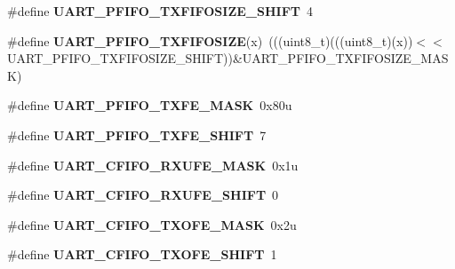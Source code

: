 \begin{DoxyCompactItemize}
\item 
\#define {\bfseries U\+A\+R\+T\+\_\+\+P\+F\+I\+F\+O\+\_\+\+T\+X\+F\+I\+F\+O\+S\+I\+Z\+E\+\_\+\+S\+H\+I\+FT}~4\hypertarget{group__UART__Register__Masks_gaa0377f9b585a07f11f887a7d2c8133c8}{}\label{group__UART__Register__Masks_gaa0377f9b585a07f11f887a7d2c8133c8}

\item 
\#define {\bfseries U\+A\+R\+T\+\_\+\+P\+F\+I\+F\+O\+\_\+\+T\+X\+F\+I\+F\+O\+S\+I\+ZE}(x)~(((uint8\+\_\+t)(((uint8\+\_\+t)(x))$<$$<$U\+A\+R\+T\+\_\+\+P\+F\+I\+F\+O\+\_\+\+T\+X\+F\+I\+F\+O\+S\+I\+Z\+E\+\_\+\+S\+H\+I\+FT))\&U\+A\+R\+T\+\_\+\+P\+F\+I\+F\+O\+\_\+\+T\+X\+F\+I\+F\+O\+S\+I\+Z\+E\+\_\+\+M\+A\+SK)\hypertarget{group__UART__Register__Masks_ga4c13afc31f45e633d2dc02707b332d11}{}\label{group__UART__Register__Masks_ga4c13afc31f45e633d2dc02707b332d11}

\item 
\#define {\bfseries U\+A\+R\+T\+\_\+\+P\+F\+I\+F\+O\+\_\+\+T\+X\+F\+E\+\_\+\+M\+A\+SK}~0x80u\hypertarget{group__UART__Register__Masks_gabd2ffab4f7a98fcfc64dcd37db1b289b}{}\label{group__UART__Register__Masks_gabd2ffab4f7a98fcfc64dcd37db1b289b}

\item 
\#define {\bfseries U\+A\+R\+T\+\_\+\+P\+F\+I\+F\+O\+\_\+\+T\+X\+F\+E\+\_\+\+S\+H\+I\+FT}~7\hypertarget{group__UART__Register__Masks_gaf418bafa3c46ece2f82d0c831e8aea47}{}\label{group__UART__Register__Masks_gaf418bafa3c46ece2f82d0c831e8aea47}

\item 
\#define {\bfseries U\+A\+R\+T\+\_\+\+C\+F\+I\+F\+O\+\_\+\+R\+X\+U\+F\+E\+\_\+\+M\+A\+SK}~0x1u\hypertarget{group__UART__Register__Masks_ga42bfb17cbfc685358f621e71f35225af}{}\label{group__UART__Register__Masks_ga42bfb17cbfc685358f621e71f35225af}

\item 
\#define {\bfseries U\+A\+R\+T\+\_\+\+C\+F\+I\+F\+O\+\_\+\+R\+X\+U\+F\+E\+\_\+\+S\+H\+I\+FT}~0\hypertarget{group__UART__Register__Masks_ga9d089a8ed91922d0da34a362a29a2bd5}{}\label{group__UART__Register__Masks_ga9d089a8ed91922d0da34a362a29a2bd5}

\item 
\#define {\bfseries U\+A\+R\+T\+\_\+\+C\+F\+I\+F\+O\+\_\+\+T\+X\+O\+F\+E\+\_\+\+M\+A\+SK}~0x2u\hypertarget{group__UART__Register__Masks_gac0d4e861e21453eecfc55ae37c97262d}{}\label{group__UART__Register__Masks_gac0d4e861e21453eecfc55ae37c97262d}

\item 
\#define {\bfseries U\+A\+R\+T\+\_\+\+C\+F\+I\+F\+O\+\_\+\+T\+X\+O\+F\+E\+\_\+\+S\+H\+I\+FT}~1\hypertarget{group__UART__Register__Masks_ga10885c0219ee82009a9041c1018e205c}{}\label{group__UART__Register__Masks_ga10885c0219ee82009a9041c1018e205c}


\end{DoxyCompactItemize}
